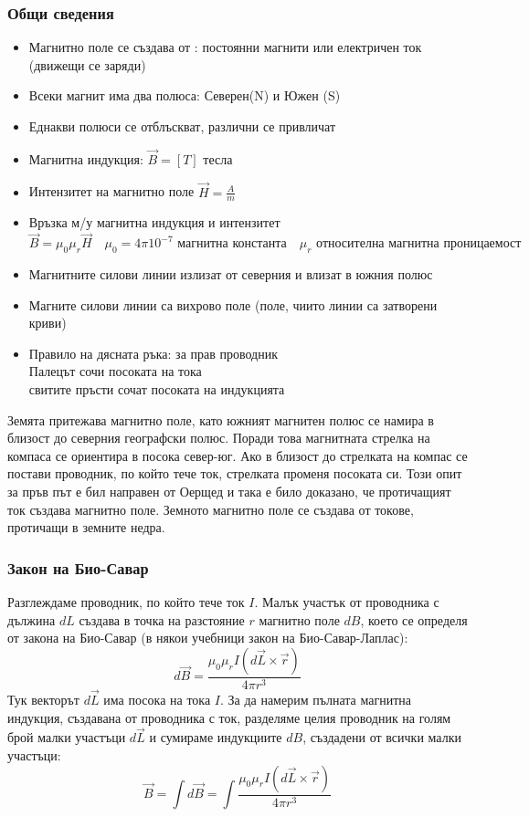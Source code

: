\documentclass[fleqn, 12pt]{article}
\theoremstyle{definition}
\begin{document}
\subsubsection{Общи сведения}
\begin{itemize}
\item Магнитно поле се създава от : постоянни магнити или електричен ток (движещи се заряди)
\item Всеки магнит има два полюса: Северен(N) и Южен (S)
\item Еднакви полюси се отблъскват, различни се привличат
\item Магнитна индукция: $\vec{B} = [T]$ тесла
\item Интензитет на магнитно поле $\vec{H} = \frac{A}{m}$
\item Връзка м/у магнитна индукция и интензитет
$$\vec{B} = \mu_0 \mu_r \vec{H} \quad \mu_0 = 4\pi10^{-7} \text{ магнитна константа} \quad \mu_r \text{ относителна магнитна проницаемост}$$
\item Магнитните силови линии излизат от северния и влизат в южния полюс
\item Магните силови линии са вихрово поле (поле, чиито линии са затворени криви)
\item Правило на дясната ръка: за прав проводник\\
Палецът сочи посоката на тока \\
свитите пръсти сочат посоката на индукцията
\end{itemize}
Земята притежава магнитно поле, като южният
магнитен полюс се намира в близост до северния
географски полюс. 
Поради това магнитната
стрелка на компаса се ориентира в посока север-юг. Ако в близост до стрелката на
компас се постави проводник, по който тече ток, стрелката променя посоката си. Този
опит за пръв път е бил направен от Оерщед и така е било доказано, че протичащият ток
създава магнитно поле. Земното магнитно поле се създава от токове, протичащи в
земните недра.

\subsubsection{Закон на Био-Савар}
Разглеждаме проводник, по който тече ток $I$. 
Малък участък от
проводника с дължина
$dL$ създава в точка на разстояние $r$ магнитно поле $dB$, което се определя от закона на Био-Савар (в
някои учебници закон на Био-Савар-Лаплас):
$$d\vec{B} = \frac{\mu_0 \mu_r I (d\vec{L}\times \vec{r})}{4\pi r^3}$$
Тук векторът $d\vec{L}$ има посока на тока $I$. За да намерим пълната
магнитна индукция, създавана от проводника с ток, разделяме
целия проводник на голям брой малки участъци $d \vec{L}$ и сумираме
индукциите $dB$, създадени от всички малки участъци:
$$\vec{B} = \int d\vec{B} = \int \frac{\mu_0 \mu_r I (d\vec{L}\times \vec{r})}{4\pi r^3}$$
\end{document}
